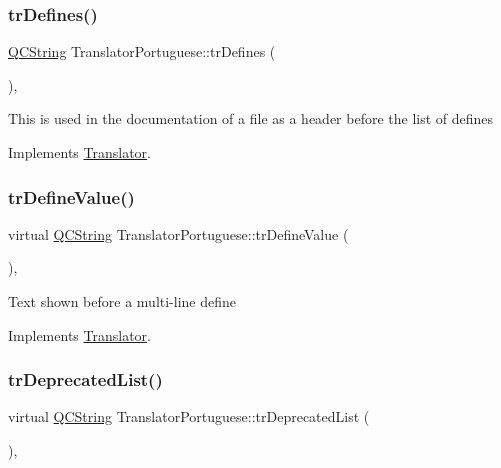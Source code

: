 \subsubsection{\texorpdfstring{trDefines()}{trDefines()}}
{\footnotesize\ttfamily \mbox{\hyperlink{class_q_c_string}{Q\+C\+String}} Translator\+Portuguese\+::tr\+Defines (\begin{DoxyParamCaption}{ }\end{DoxyParamCaption})\hspace{0.3cm}{\ttfamily [inline]}, {\ttfamily [virtual]}}

This is used in the documentation of a file as a header before the list of defines 

Implements \mbox{\hyperlink{class_translator}{Translator}}.

\mbox{\label{class_translator_portuguese_a8fee1ab27058583aec5d46af33a0fedc}} 
\subsubsection{\texorpdfstring{trDefineValue()}{trDefineValue()}}
{\footnotesize\ttfamily virtual \mbox{\hyperlink{class_q_c_string}{Q\+C\+String}} Translator\+Portuguese\+::tr\+Define\+Value (\begin{DoxyParamCaption}{ }\end{DoxyParamCaption})\hspace{0.3cm}{\ttfamily [inline]}, {\ttfamily [virtual]}}

Text shown before a multi-\/line define 

Implements \mbox{\hyperlink{class_translator}{Translator}}.

\mbox{\label{class_translator_portuguese_a1a1007b64d337d6674e1c5729c49a950}} 
\subsubsection{\texorpdfstring{trDeprecatedList()}{trDeprecatedList()}}
{\footnotesize\ttfamily virtual \mbox{\hyperlink{class_q_c_string}{Q\+C\+String}} Translator\+Portuguese\+::tr\+Deprecated\+List (\begin{DoxyParamCaption}{ }\end{DoxyParamCaption})\hspace{0.3cm}{\ttfamily [inline]}, {\ttfamily [virtual]}}

